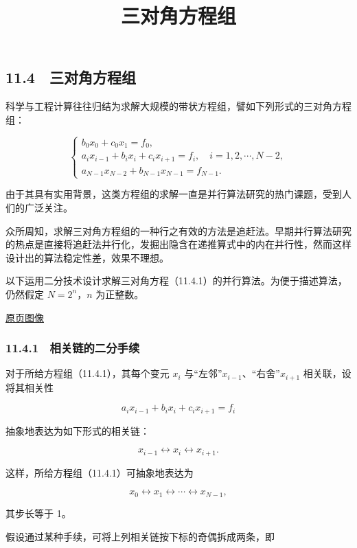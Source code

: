 \documentclass[
  10pt,
  fontset=fandol]{ctexart}
\title{三对角方程组}
\author{}
\date{}
\begin{document}
\maketitle

\subsection{11.4　三对角方程组}\label{ux4e09ux5bf9ux89d2ux65b9ux7a0bux7ec4}

科学与工程计算往往归结为求解大规模的带状方程组，譬如下列形式的三对角方程组：

\[
\begin{cases}
b_0x_0+c_0x_1=f_0,\\
a_ix_{i-1}+b_ix_i+c_ix_{i+1}=f_i,\quad i=1,2,\cdots,N-2,\\
a_{N-1}x_{N-2}+b_{N-1}x_{N-1}=f_{N-1}.
\end{cases}
\tag{11.4.1}
\]

由于其具有实用背景，这类方程组的求解一直是并行算法研究的热门课题，受到人们的广泛关注。

众所周知，求解三对角方程组的一种行之有效的方法是追赶法。早期并行算法研究的热点是直接将追赶法并行化，发掘出隐含在递推算式中的内在并行性，然而这样设计出的算法稳定性差，效果不理想。

以下运用二分技术设计求解三对角方程（11.4.1）的并行算法。为便于描述算法，仍然假定 \(N=2^n\)，\(n\) 为正整数。

\href{../../source-images/pdf-289.jpeg}{原页图像}

\subsubsection{11.4.1　相关链的二分手续}\label{ux76f8ux5173ux94feux7684ux4e8cux5206ux624bux7eed}

对于所给方程组（11.4.1），其每个变元 \(x_i\) 与``左邻''\(x_{i-1}\)、``右舍''\(x_{i+1}\) 相关联，设将其相关性

\[
a_ix_{i-1}+b_ix_i+c_ix_{i+1}=f_i
\]

抽象地表达为如下形式的相关链：

\[
x_{i-1}\leftrightarrow x_i\leftrightarrow x_{i+1}.
\]

这样，所给方程组（11.4.1）可抽象地表达为

\[
x_0\leftrightarrow x_1\leftrightarrow\cdots\leftrightarrow x_{N-1},
\]

其步长等于 1。

假设通过某种手续，可将上列相关链按下标的奇偶拆成两条，即
\end{document}
